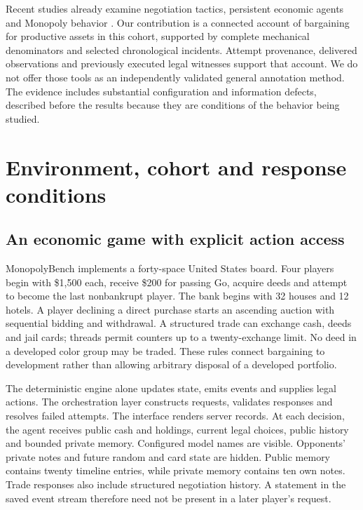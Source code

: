 \documentclass[11pt,letterpaper]{article}
\begin{document}
Recent studies already examine negotiation tactics, persistent economic agents and Monopoly behavior \citep{bianchi2024negotiationarena,li2026arena,wu2026agentmonopoly,hu2026finboardbench}. Our contribution is a connected account of bargaining for productive assets in this cohort, supported by complete mechanical denominators and selected chronological incidents. Attempt provenance, delivered observations and previously executed legal witnesses support that account. We do not offer those tools as an independently validated general annotation method. The evidence includes substantial configuration and information defects, described before the results because they are conditions of the behavior being studied.

\section{Environment, cohort and response conditions}

\subsection{An economic game with explicit action access}

MonopolyBench implements a forty-space United States board. Four players begin with \$1,500 each, receive \$200 for passing Go, acquire deeds and attempt to become the last nonbankrupt player. The bank begins with 32 houses and 12 hotels. A player declining a direct purchase starts an ascending auction with sequential bidding and withdrawal. A structured trade can exchange cash, deeds and jail cards; threads permit counters up to a twenty-exchange limit. No deed in a developed color group may be traded. These rules connect bargaining to development rather than allowing arbitrary disposal of a developed portfolio.

The deterministic engine alone updates state, emits events and supplies legal actions. The orchestration layer constructs requests, validates responses and resolves failed attempts. The interface renders server records. At each decision, the agent receives public cash and holdings, current legal choices, public history and bounded private memory. Configured model names are visible. Opponents' private notes and future random and card state are hidden. Public memory contains twenty timeline entries, while private memory contains ten own notes. Trade responses also include structured negotiation history. A statement in the saved event stream therefore need not be present in a later player's request.
\end{document}
